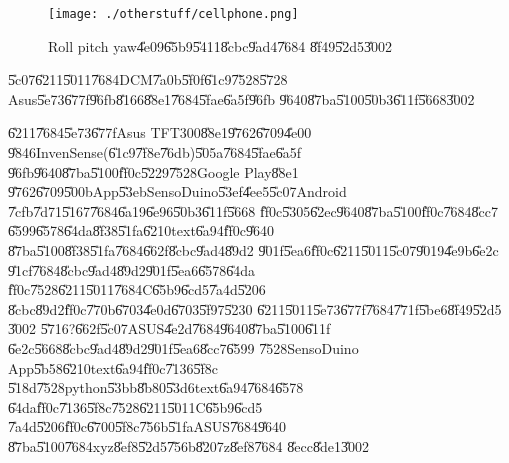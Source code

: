 \begin{figure}[th]
\caption{Roll pitch yaw\U{4e09}\U{65b9}\U{5411}\U{8cbc}\U{9ad4}\U{7684}%
\U{8f49}\U{52d5}\U{3002}}
\begin{center}
\texttt{[image: ./otherstuff/cellphone.png]}
\end{center}
\end{figure}

\begin{case}
\U{5c07}\U{6211}\U{5011}\U{7684}DCM\U{7a0b}\U{5f0f}\U{61c9}\U{7528}\U{5728}%
Asus\U{5e73}\U{677f}\U{96fb}\U{8166}\U{88e1}\U{7684}\U{5fae}\U{6a5f}\U{96fb}%
\U{9640}\U{87ba}\U{5100}\U{50b3}\U{611f}\U{5668}\U{3002}
\end{case}

\U{6211}\U{7684}\U{5e73}\U{677f}Asus TFT300\U{88e1}\U{9762}\U{6709}\U{4e00}%
\U{9846}InvenSense(\U{61c9}\U{7f8e}\U{76db})\U{505a}\U{7684}\U{5fae}\U{6a5f}%
\U{96fb}\U{9640}\U{87ba}\U{5100}\U{ff0c}\U{5229}\U{7528}Google Play\U{88e1}%
\U{9762}\U{6709}\U{500b}App\U{53eb}SensoDuino\U{53ef}\U{4ee5}\U{5c07}Android%
\U{7cfb}\U{7d71}\U{5167}\U{7684}\U{6a19}\U{6e96}\U{50b3}\U{611f}\U{5668}%
\U{ff0c}\U{5305}\U{62ec}\U{9640}\U{87ba}\U{5100}\U{ff0c}\U{7684}\U{8cc7}%
\U{6599}\U{6578}\U{64da}\U{8f38}\U{51fa}\U{6210}text\U{6a94}\U{ff0c}\U{9640}%
\U{87ba}\U{5100}\U{8f38}\U{51fa}\U{7684}\U{662f}\U{8cbc}\U{9ad4}\U{89d2}%
\U{901f}\U{5ea6}\U{ff0c}\U{6211}\U{5011}\U{5c07}\U{9019}\U{4e9b}\U{6e2c}%
\U{91cf}\U{7684}\U{8cbc}\U{9ad4}\U{89d2}\U{901f}\U{5ea6}\U{6578}\U{64da}%
\U{ff0c}\U{7528}\U{6211}\U{5011}\U{7684}C\U{65b9}\U{6cd5}\U{7a4d}\U{5206}%
\U{8cbc}\U{89d2}\U{ff0c}\U{770b}\U{6703}\U{4e0d}\U{6703}\U{5f97}\U{5230}%
\U{6211}\U{5011}\U{5e73}\U{677f}\U{7684}\U{771f}\U{5be6}\U{8f49}\U{52d5}%
\U{3002}\newline
\U{5716}?\U{662f}\U{5c07}ASUS\U{4e2d}\U{7684}\U{9640}\U{87ba}\U{5100}\U{611f}%
\U{6e2c}\U{5668}\U{8cbc}\U{9ad4}\U{89d2}\U{901f}\U{5ea6}\U{8cc7}\U{6599}%
\U{7528}SensoDuino App\U{5b58}\U{6210}text\U{6a94}\U{ff0c}\U{7136}\U{5f8c}%
\U{518d}\U{7528}python\U{53bb}\U{8b80}\U{53d6}text\U{6a94}\U{7684}\U{6578}%
\U{64da}\U{ff0c}\U{7136}\U{5f8c}\U{7528}\U{6211}\U{5011}C\U{65b9}\U{6cd5}%
\U{7a4d}\U{5206}\U{ff0c}\U{6700}\U{5f8c}\U{756b}\U{51fa}ASUS\U{7684}\U{9640}%
\U{87ba}\U{5100}\U{7684}xyz\U{8ef8}\U{52d5}\U{756b}\U{8207}z\U{8ef8}\U{7684}%
\U{8ecc}\U{8de1}\U{3002}

